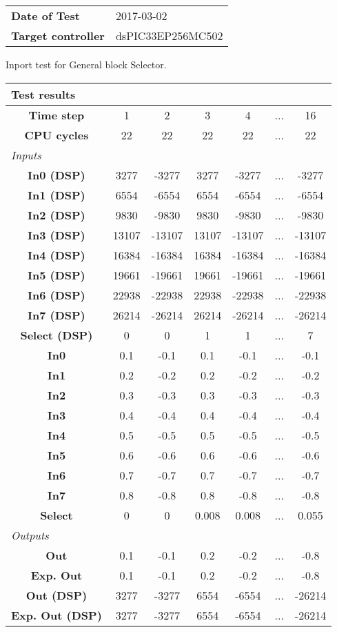 \begin{tabular}{l l}
\textbf{Date of Test} & 2017-03-02 \tabularnewline
\textbf{Target controller} & dsPIC33EP256MC502 \tabularnewline
\end{tabular}
\vspace{1ex}
Inport test for General block Selector.

\vspace{1em}
\begin{tabularx}{\textwidth}{|c|c|c|c|c|>{\centering\arraybackslash}X|c|}
\hline
\multicolumn{7}{|l|}{\cellcolor[gray]{0.8}\textbf{Test results}} \tabularnewline \hline
\textbf{Time step} & 1 & 2 & 3 & 4 & ... & 16 \tabularnewline \hline
\textbf{CPU cycles} & 22 & 22 & 22 & 22 & ... & 22 \tabularnewline \hline
\multicolumn{7}{|l|}{\cellcolor[gray]{0.9}\textit{Inputs}} \tabularnewline \hline
\textbf{In0 (DSP)} & 3277 & -3277 & 3277 & -3277 & ... & -3277 \tabularnewline \hline
\textbf{In1 (DSP)} & 6554 & -6554 & 6554 & -6554 & ... & -6554 \tabularnewline \hline
\textbf{In2 (DSP)} & 9830 & -9830 & 9830 & -9830 & ... & -9830 \tabularnewline \hline
\textbf{In3 (DSP)} & 13107 & -13107 & 13107 & -13107 & ... & -13107 \tabularnewline \hline
\textbf{In4 (DSP)} & 16384 & -16384 & 16384 & -16384 & ... & -16384 \tabularnewline \hline
\textbf{In5 (DSP)} & 19661 & -19661 & 19661 & -19661 & ... & -19661 \tabularnewline \hline
\textbf{In6 (DSP)} & 22938 & -22938 & 22938 & -22938 & ... & -22938 \tabularnewline \hline
\textbf{In7 (DSP)} & 26214 & -26214 & 26214 & -26214 & ... & -26214 \tabularnewline \hline
\textbf{Select (DSP)} & 0 & 0 & 1 & 1 & ... & 7 \tabularnewline \hline
\textbf{In0} & 0.1 & -0.1 & 0.1 & -0.1 & ... & -0.1 \tabularnewline \hline
\textbf{In1} & 0.2 & -0.2 & 0.2 & -0.2 & ... & -0.2 \tabularnewline \hline
\textbf{In2} & 0.3 & -0.3 & 0.3 & -0.3 & ... & -0.3 \tabularnewline \hline
\textbf{In3} & 0.4 & -0.4 & 0.4 & -0.4 & ... & -0.4 \tabularnewline \hline
\textbf{In4} & 0.5 & -0.5 & 0.5 & -0.5 & ... & -0.5 \tabularnewline \hline
\textbf{In5} & 0.6 & -0.6 & 0.6 & -0.6 & ... & -0.6 \tabularnewline \hline
\textbf{In6} & 0.7 & -0.7 & 0.7 & -0.7 & ... & -0.7 \tabularnewline \hline
\textbf{In7} & 0.8 & -0.8 & 0.8 & -0.8 & ... & -0.8 \tabularnewline \hline
\textbf{Select} & 0 & 0 & 0.008 & 0.008 & ... & 0.055 \tabularnewline \hline
\multicolumn{7}{|l|}{\cellcolor[gray]{0.9}\textit{Outputs}} \tabularnewline \hline
\textbf{Out} & 0.1 & -0.1 & 0.2 & -0.2 & ... & -0.8 \tabularnewline \hline
\textbf{Exp. Out} & 0.1 & -0.1 & 0.2 & -0.2 & ... & -0.8 \tabularnewline \hline
\textbf{Out (DSP)} & 3277 & -3277 & 6554 & -6554 & ... & -26214 \tabularnewline \hline
\textbf{Exp. Out (DSP)} & 3277 & -3277 & 6554 & -6554 & ... & -26214 \tabularnewline \hline
\end{tabularx}
\vspace{1ex}

